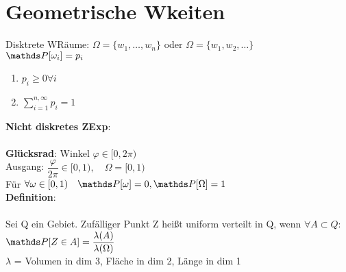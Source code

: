 \chapter{Geometrische Wkeiten}
Disktrete WRäume: $\Omega = \{w_1,\dots,w_n\}$ oder $\Omega = \{w_1,w_2,\dots\}$\smallskip\\
$\PP[\omega_i]=p_i$
\begin{enumerate}
	\item $p_i \geq 0 \forall i$
	\item $\sum_{i=1}^{n,\infty}p_i = 1$
\end{enumerate}
\textbf{Nicht diskretes ZExp}:\\
\smallskip\\
\textbf{Glücksrad}: Winkel $\varphi\in[0,2\pi)$\\
Ausgang: $\dfrac{\varphi}{2\pi}\in[0,1), \quad \Omega =[0,1)$\medskip\\
Für $\forall \omega \in [0,1) \quad \PP[\omega]=0, \PP[\Omega] = 1$\medskip\\
\textbf{Definition}:\\
\smallskip\\
Sei Q ein Gebiet. Zufälliger Punkt Z heißt uniform verteilt in Q, wenn $\forall A \subset Q:$\smallskip\\
$\PP[Z \in A] = \dfrac{\lambda(A)}{\lambda(\Omega)}$\smallskip\\
$\lambda$ = Volumen in dim 3, Fläche in dim 2, Länge in dim 1\\
